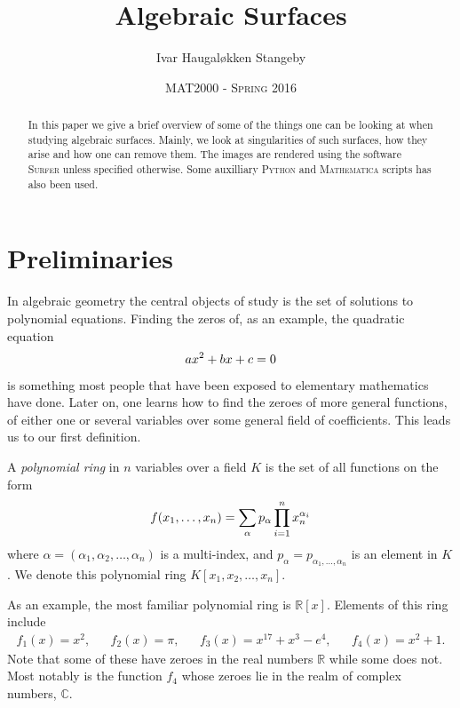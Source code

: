 \documentclass{article}
\title{Algebraic Surfaces}
\author{Ivar Haugal{\o}kken Stangeby}
\date{\textsc{MAT2000 - Spring 2016}}
\newcommand{\R}{\ensuremath{\mathbb{R}}}
\newcommand{\C}{\ensuremath{\mathbb{C}}}
\begin{document}
    \maketitle

    \begin{abstract}
       In this paper we give a brief overview of some of the things one can be
       looking at when studying algebraic surfaces.  Mainly, we look at
       singularities of such surfaces, how they arise and how one can remove
       them. The images are rendered using the software \textsc{Surfer} unless
       specified otherwise.  Some auxilliary \textsc{Python} and
       \textsc{Mathematica} scripts has also been used.
    \end{abstract}

    \tableofcontents

    \section{Preliminaries}
    \label{sec:preliminaries}
    
    In algebraic geometry the central objects of study is the set of solutions
    to polynomial equations. Finding the zeros of, as an example, the quadratic
    equation
    \begin{equation}
        \notag
        ax^2 + bx + c = 0
    \end{equation}
    is something most people that have been exposed to elementary mathematics
    have done. Later on, one learns how to find the zeroes of more general
    functions, of either one or several variables over some general field of
    coefficients. This leads us to our first definition.

    \begin{definition}
        A \emph{polynomial ring} in $n$ variables over a field $K$ is the set
        of all functions on the form
        \begin{equation}
            \notag
            f(x_1, \ldots, x_n) = \sum^{}_{\alpha} p_{\alpha}\prod_{i=1}^{n} x_n^{\alpha_i}
        \end{equation}
        where $\alpha = (\alpha_1, \alpha_2, \ldots, \alpha_n)$ is a
        multi-index, and $p_\alpha = p_{\alpha_1,\ldots,\alpha_n}$ is an
        element in $K$.  We denote this polynomial ring $K[x_1, x_2, \ldots,
        x_n]$.
    \end{definition} 
    As an example, the most familiar polynomial ring is $\R[x]$. Elements of
    this ring include
    \begin{align*}
        f_1(x) = x^2, && f_2(x) = \pi, && f_3(x) = x^{17} + x^{3} - e^{4}, && f_4(x) = x^2 + 1.
    \end{align*} 
    Note that some of these have zeroes in the real numbers $\R$ while some
    does not. Most notably is the function $f_4$ whose zeroes lie in the realm
    of complex numbers, $\C$.
\end{document}

